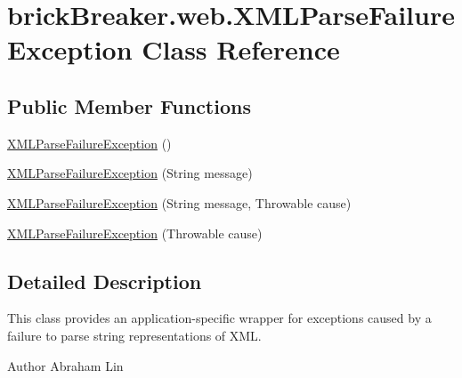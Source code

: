 \hypertarget{classbrick_breaker_1_1web_1_1_x_m_l_parse_failure_exception}{
\section{brickBreaker.web.XMLParseFailureException Class Reference}
\label{classbrick_breaker_1_1web_1_1_x_m_l_parse_failure_exception}
}
\subsection*{Public Member Functions}
\begin{DoxyCompactItemize}
\item 
\hyperlink{classbrick_breaker_1_1web_1_1_x_m_l_parse_failure_exception_a723d3ff61adb79b5cf401fe14c1832df}{XMLParseFailureException} ()
\item 
\hyperlink{classbrick_breaker_1_1web_1_1_x_m_l_parse_failure_exception_af66e18584855ce1dad5cc16b68ca7df1}{XMLParseFailureException} (String message)
\item 
\hyperlink{classbrick_breaker_1_1web_1_1_x_m_l_parse_failure_exception_a481f9e2823e591526dddb632a3cb8ab7}{XMLParseFailureException} (String message, Throwable cause)
\item 
\hyperlink{classbrick_breaker_1_1web_1_1_x_m_l_parse_failure_exception_aa07904b5ff321a28d6ed9669236fa98b}{XMLParseFailureException} (Throwable cause)
\end{DoxyCompactItemize}


\subsection{Detailed Description}
This class provides an application-\/specific wrapper for exceptions caused by a failure to parse string representations of XML.

\begin{DoxyAuthor}{Author}
Abraham Lin 
\end{DoxyAuthor}


